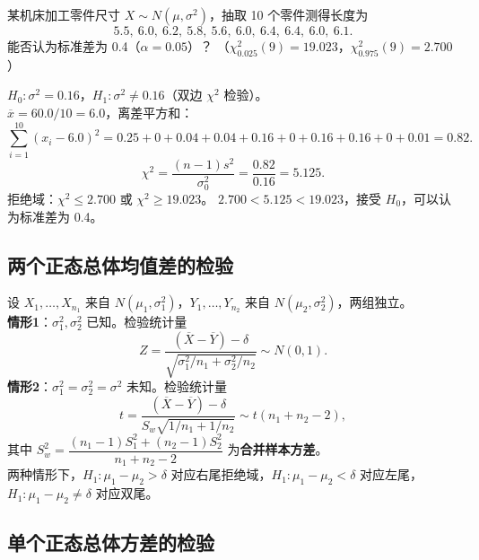 \documentclass[lang=cn,11pt]{elegantbook}
\begin{document}
\begin{exercise} \label{ex:ht_chi2_two}
某机床加工零件尺寸 \(X\sim N(\mu,\sigma^2)\)，抽取 10 个零件测得长度为
\[
5.5,\ 6.0,\ 6.2,\ 5.8,\ 5.6,\ 6.0,\ 6.4,\ 6.4,\ 6.0,\ 6.1.
\]
能否认为标准差为 0.4（\(\alpha=0.05\)）？
（\(\chi^2_{0.025}(9)=19.023\)，\(\chi^2_{0.975}(9)=2.700\)）
\end{exercise}
\begin{solution}
\(H_0\colon\sigma^2=0.16\)，\(H_1\colon\sigma^2\neq0.16\)（双边 \(\chi^2\) 检验）。\\
\(\overline{x}=60.0/10=6.0\)，离差平方和：
\[
\sum_{i=1}^{10}(x_i-6.0)^2=0.25+0+0.04+0.04+0.16+0+0.16+0.16+0+0.01=0.82.
\]
\[
\chi^2=\frac{(n-1)s^2}{\sigma_0^2}=\frac{0.82}{0.16}=5.125.
\]
拒绝域：\(\chi^2\leq 2.700\) 或 \(\chi^2\geq 19.023\)。
\(2.700<5.125<19.023\)，接受 \(H_0\)，可以认为标准差为 0.4。
\end{solution}


\subsection{两个正态总体均值差的检验}

\begin{property}[两个正态总体均值差的检验]\label{prop:two-sample-mean-test}
设 \(X_1,\dots,X_{n_1}\) 来自 \(N(\mu_1,\sigma_1^2)\)，\(Y_1,\dots,Y_{n_2}\) 来自 \(N(\mu_2,\sigma_2^2)\)，两组独立。\\
\textbf{情形1}：\(\sigma_1^2, \sigma_2^2\) 已知。检验统计量
\[
Z = \frac{(\overline{X}-\overline{Y})-\delta}{\sqrt{\sigma_1^2/n_1+\sigma_2^2/n_2}} \sim N(0,1).
\]
\textbf{情形2}：\(\sigma_1^2=\sigma_2^2=\sigma^2\) 未知。检验统计量
\[
t = \frac{(\overline{X}-\overline{Y})-\delta}{S_w\sqrt{1/n_1+1/n_2}} \sim t(n_1+n_2-2),
\]
其中 \(S_w^2 = \dfrac{(n_1-1)S_1^2+(n_2-1)S_2^2}{n_1+n_2-2}\) 为\textbf{合并样本方差}。\\
两种情形下，\(H_1\colon \mu_1-\mu_2 > \delta\) 对应右尾拒绝域，\(H_1\colon \mu_1-\mu_2 < \delta\) 对应左尾，\(H_1\colon \mu_1-\mu_2 \neq \delta\) 对应双尾。
\end{property}

\subsection{单个正态总体方差的检验}
\end{document}
